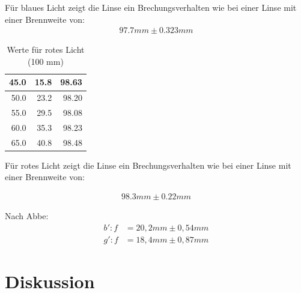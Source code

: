 Für blaues Licht zeigt die Linse ein Brechungsverhalten wie bei einer Linse mit einer Brennweite von:
\begin{align*}
97.7 mm	\pm 0.323 mm
\end{align*}

\begin{table}[htbp]
\begin{center}
\begin{tabular}{|r|r|r|}
\hline
45.0 & 15.8 & 98.63 \\ \hline
50.0 & 23.2 & 98.20 \\ \hline
55.0 & 29.5 & 98.08 \\ \hline
60.0 & 35.3 & 98.23 \\ \hline
65.0 & 40.8 & 98.48 \\ \hline
\end{tabular}
\end{center}
\caption{Werte für rotes Licht (100 mm)}
\label{}
\end{table}

Für rotes Licht zeigt die Linse ein Brechungsverhalten wie bei einer Linse mit einer Brennweite von:

\begin{align*}
98.3 mm	\pm 0.22 mm
\end{align*}


Nach Abbe:
\begin{align*}
b': f&=20,2 mm         \pm 0,54 mm\\
g': f&=18,4 mm          \pm 0,87 mm
\end{align*}

\section{Diskussion}





